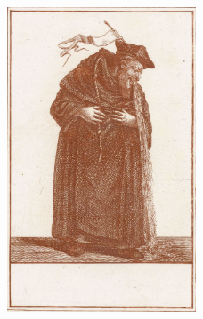 {\begin{figure}[tbh]
  \centering
  \includegraphics[keepaspectratio,width=0.5\textwidth]{figures/Vomiting-monk-Jacob-Gole-small.jpg}
  \caption{}
  \label{fig:vomitingmonk}
\end{figure}

}

